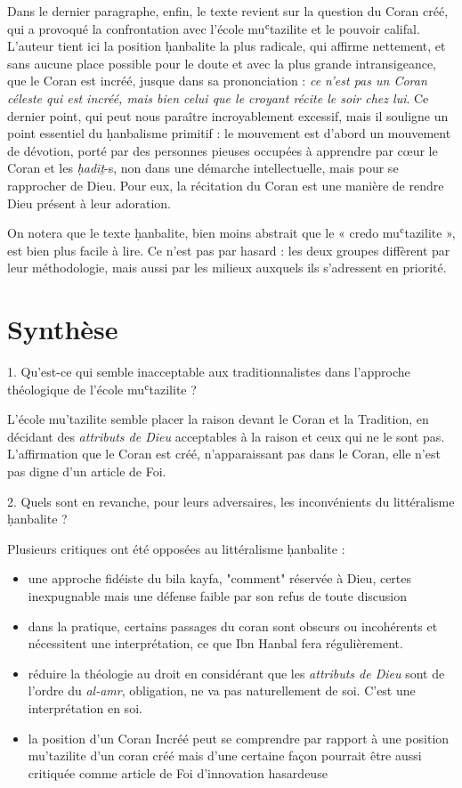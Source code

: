 Dans le dernier paragraphe, enfin, le texte revient sur la question du
Coran créé, qui a provoqué la confrontation avec l'école muʿtazilite et
le pouvoir califal. L'auteur tient ici la position ḥanbalite la plus
radicale, qui affirme nettement, et sans aucune place possible pour le
doute et avec la plus grande intransigeance, que le Coran est incréé,
jusque dans sa prononciation : \textit{ce n'est pas un Coran céleste qui est
incréé, mais bien celui que le croyant récite le soir chez lui}. Ce
dernier point, qui peut nous paraître incroyablement excessif, mais il
souligne un point essentiel du ḥanbalisme primitif : le mouvement est
d'abord un mouvement de dévotion, porté par des personnes pieuses
occupées à apprendre par cœur le
Coran et les \emph{ḥadīṯ}-s, non dans une démarche intellectuelle, mais
pour se rapprocher de Dieu. Pour eux, la récitation du Coran est une
manière de rendre Dieu présent à leur adoration.

On notera que le texte ḥanbalite, bien moins abstrait que le « credo
muʿtazilite », est bien plus facile à lire. Ce n'est pas par hasard :
les deux groupes diffèrent par leur méthodologie, mais aussi par les
milieux auxquels ils s'adressent en priorité.

\section{Synthèse}

  1. Qu’est-ce qui semble inacceptable aux traditionnalistes dans l’approche théologique de l’école muʿtazilite ? 
  \begin{Synthesis}
  L'école mu'tazilite semble placer la raison devant le Coran et la Tradition, en décidant des \textit{attributs de Dieu} acceptables à la raison et ceux qui ne le sont pas. L'affirmation que le Coran est créé, n'apparaissant pas dans le Coran, elle n'est pas digne d'un article de Foi.
  \end{Synthesis}
  
  2.    Quels sont en revanche, pour leurs adversaires, les inconvénients du littéralisme ḥanbalite ? 
   \begin{Synthesis}
  Plusieurs critiques ont été opposées au littéralisme ḥanbalite :
  \begin{itemize}
      \item une approche fidéiste du bila kayfa, "comment" réservée à Dieu, certes inexpugnable mais une défense faible par son refus de toute discusion
      \item dans la pratique, certains passages du coran sont obscurs ou incohérents et nécessitent une interprétation, ce que Ibn Hanbal fera régulièrement.
      \item réduire la théologie au droit en considérant que les \textit{attributs de Dieu} sont de l'ordre du \emph{al-amr}, obligation, ne va pas naturellement de soi. C'est une interprétation en soi. 
      \item la position d'un Coran Incréé peut se comprendre par rapport à une position mu'tazilite d'un coran créé mais d'une certaine façon pourrait être aussi critiquée comme article de Foi d'innovation hasardeuse
  \end{itemize}
  \end{Synthesis}
  

